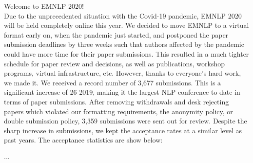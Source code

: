 Welcome to EMNLP 2020!\\

Due to the unprecedented situation with the Covid-19 pandemic, EMNLP 2020 will be held completely
online this year. We decided to move EMNLP to a virtual format early on, when the pandemic just
started, and postponed the paper submission deadlines by three weeks such that authors affected by the
pandemic could have more time for their paper submissions. This resulted in a much tighter schedule
for paper review and decisions, as well as publications, workshop programs, virtual infrastructure, etc.
However, thanks to everyone’s hard work, we made it.
We received a record number of 3,677 submissions. This is a significant increase of 26%
2019, making it the largest NLP conference to date in terms of paper submissions. After removing
withdrawals and desk rejecting papers which violated our formatting requirements, the anonymity policy,
or double submission policy, 3,359 submissions were sent out for review. Despite the sharp increase in
submissions, we kept the acceptance rates at a similar level as past years. The acceptance statistics are
show below:

...\\
